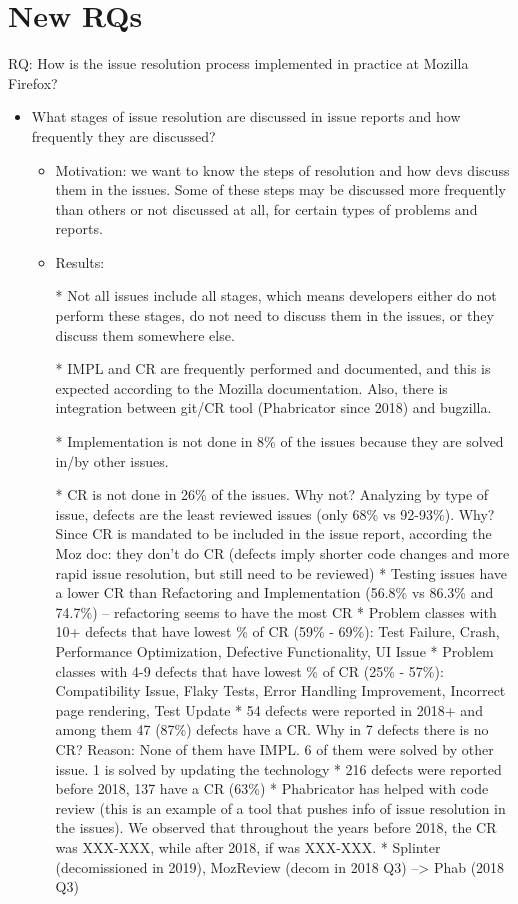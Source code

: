 \section{New RQs}


RQ: How is the issue resolution process implemented in practice at Mozilla Firefox?

\begin{itemize}
	\item What stages  of issue resolution are discussed in issue reports and how frequently they are discussed?
	\begin{itemize}
		\item Motivation: we want to know the steps of resolution and how devs discuss them in the issues. Some of these steps may be discussed more frequently than others or not discussed at all, for certain types of problems and reports.
		\item Results: 
		
		* Not all issues include all stages, which means developers either do not perform these stages, do not need to discuss them in the issues, or they discuss them somewhere else.
		
		* IMPL and CR are frequently performed and documented, and this is expected according to the Mozilla documentation.  Also, there is integration between git/CR tool (Phabricator since 2018) and bugzilla. 
		
		* Implementation is not done in 8\% of the issues because they are solved in/by other issues.
		
		* CR is not done in 26\% of the issues. Why not? Analyzing by type of issue, defects are the least reviewed issues (only 68\% vs 92-93\%). Why? Since CR is mandated to be included in the issue report, according the Moz doc: they don't do CR (defects imply shorter code changes and more rapid issue resolution, but still need to be reviewed)
		* Testing issues have a lower CR than Refactoring and Implementation (56.8\% vs 86.3\% and 74.7\%) -- refactoring seems to have the most CR
		* Problem classes with 10+ defects that have lowest \% of CR (59\% - 69\%): Test Failure, Crash, Performance Optimization, Defective Functionality, UI Issue 
		* Problem classes with 4-9 defects that have lowest \% of CR (25\% - 57\%): Compatibility Issue, Flaky Tests, Error Handling Improvement, Incorrect page rendering, Test Update
		* 54 defects were reported in 2018+ and among them 47 (87\%) defects have a CR.  Why in 7 defects there is no CR?  Reason: None of them have IMPL. 6 of them were solved by other issue. 1 is solved by updating the technology
		* 216 defects were reported before 2018,  137 have a CR (63\%)
		* Phabricator has helped with code review (this is an example of a tool that pushes info of issue resolution in the issues). We observed that throughout the years before 2018, the CR was XXX-XXX, while after 2018, if was XXX-XXX.
		* Splinter (decomissioned in 2019), MozReview (decom in 2018 Q3) --> Phab (2018 Q3)
		

\end{itemize}
\end{itemize}
